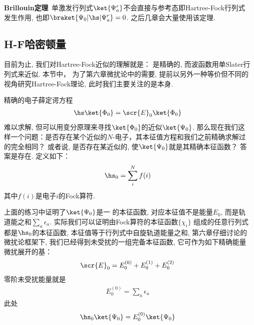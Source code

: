 \textbf{Brillouin定理}\ 单激发行列式$\ket{\Psi_a^r}$不会直接与参考态即Hartree-Fock行列式发生作用, 也即$\braket{\Psi_0|\hs|\Psi_a^r}=0$. 之后几章会大量使用该定理.
\subsection{H-F哈密顿量}
目前为止, 
我们对Hartree-Fock近似的理解就是： \ha 是精确的, 
而波函数用单Slater行列式来近似. 
本节中，
为了第六章微扰论中的需要, 
提前以另外一种等价但不同的视角研究Hartree-Fock理论, 
此时我们主要关注的是\ha 本身.


精确的电子薛定谔方程
\begin{align}
	\hs\ket{\Phi_0} = \scr{E}_0\ket{\Phi_0}
\end{align}
难以求解, 但可以用变分原理来寻找$\ket{\Phi_0}$的近似$\ket{\Psi_0}$. 
那么现在我们这样一个问题：是否存在某个近似的$N$-电子\ha ，其本征值方程和我们之前精确求解过的完全相同？
或者说, 是否存在某近似的\ha, 使$\ket{\Psi_0}$就是其精确本征函数？
答案是存在. \emph{\hft{} \ha}定义如下：
\begin{align}
	\hs_0 = \sum_i^Nf(i)
\end{align}
其中$f(i)是$电子$i$的Fock算符.


上面的练习中证明了$\ket{\Psi_0}$是一\hft{} \ha 的本征函数, 
对应本征值不是\hft 能量$E_0$, 
而是轨道能之和$\sum_a\epsilon_a$. 
实际我们可以证明由Fock算符的本征函数$\{\chi_i\}$ 组成的任意行列式都是$\hs_0$的本征函数, 
本征值等于行列式中自旋轨道能量之和, 
第六章仔细讨论的微扰论框架下, 
我们已经得到未受扰\ha 的一组完备本征函数, 
它可作为如下精确能量微扰展开的基：
\begin{align}
	\label{3.104}
	\scr{E}_0 = E_0^{(0)} + E_0^{(1)} + E_0^{(2)}
\end{align}
零阶未受扰能量就是
\begin{align}
	E_0^{(0)} = \sum_a\epsilon_a
\end{align}
此处
\begin{equation}
	\hs_0\ket{\Psi_0}=E_0^{(0)}\ket{\Psi_0}
\end{equation}

